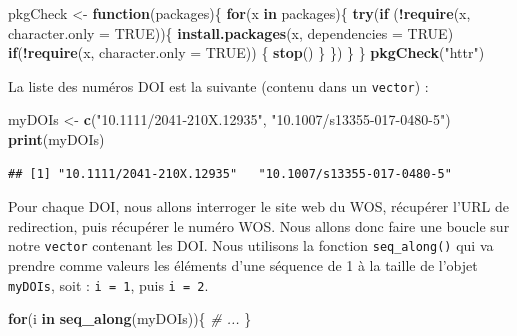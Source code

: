 \documentclass[]{book}
\newenvironment{Shaded}{\begin{snugshade}}{\end{snugshade}}
\newcommand{\CommentTok}[1]{\textcolor[rgb]{0.56,0.35,0.01}{\textit{#1}}}
\newcommand{\ControlFlowTok}[1]{\textcolor[rgb]{0.13,0.29,0.53}{\textbf{#1}}}
\newcommand{\DataTypeTok}[1]{\textcolor[rgb]{0.13,0.29,0.53}{#1}}
\newcommand{\KeywordTok}[1]{\textcolor[rgb]{0.13,0.29,0.53}{\textbf{#1}}}
\newcommand{\NormalTok}[1]{#1}
\newcommand{\OperatorTok}[1]{\textcolor[rgb]{0.81,0.36,0.00}{\textbf{#1}}}
\newcommand{\OtherTok}[1]{\textcolor[rgb]{0.56,0.35,0.01}{#1}}
\newcommand{\StringTok}[1]{\textcolor[rgb]{0.31,0.60,0.02}{#1}}
\begin{document}
\begin{Shaded}
\begin{Highlighting}[]
\NormalTok{pkgCheck <-}\StringTok{ }\ControlFlowTok{function}\NormalTok{(packages)\{}
    \ControlFlowTok{for}\NormalTok{(x }\ControlFlowTok{in}\NormalTok{ packages)\{}
        \KeywordTok{try}\NormalTok{(}\ControlFlowTok{if}\NormalTok{ (}\OperatorTok{!}\KeywordTok{require}\NormalTok{(x, }\DataTypeTok{character.only =} \OtherTok{TRUE}\NormalTok{))\{}
            \KeywordTok{install.packages}\NormalTok{(x, }\DataTypeTok{dependencies =} \OtherTok{TRUE}\NormalTok{)}
            \ControlFlowTok{if}\NormalTok{(}\OperatorTok{!}\KeywordTok{require}\NormalTok{(x, }\DataTypeTok{character.only =} \OtherTok{TRUE}\NormalTok{)) \{}
                \KeywordTok{stop}\NormalTok{()}
\NormalTok{            \}}
\NormalTok{        \})}
\NormalTok{    \}}
\NormalTok{\}}
\KeywordTok{pkgCheck}\NormalTok{(}\StringTok{"httr"}\NormalTok{)}
\end{Highlighting}
\end{Shaded}

La liste des numéros DOI est la suivante (contenu dans un \texttt{vector}) :

\begin{Shaded}
\begin{Highlighting}[]
\NormalTok{myDOIs <-}\StringTok{ }\KeywordTok{c}\NormalTok{(}\StringTok{"10.1111/2041-210X.12935"}\NormalTok{, }\StringTok{"10.1007/s13355-017-0480-5"}\NormalTok{)}
\KeywordTok{print}\NormalTok{(myDOIs)}
\end{Highlighting}
\end{Shaded}

\begin{verbatim}
## [1] "10.1111/2041-210X.12935"   "10.1007/s13355-017-0480-5"
\end{verbatim}

Pour chaque DOI, nous allons interroger le site web du WOS, récupérer l'URL de redirection, puis récupérer le numéro WOS. Nous allons donc faire une boucle sur notre \texttt{vector} contenant les DOI. Nous utilisons la fonction \texttt{seq\_along()} qui va prendre comme valeurs les éléments d'une séquence de 1 à la taille de l'objet \texttt{myDOIs}, soit : \texttt{i\ =\ 1}, puis \texttt{i\ =\ 2}.

\begin{Shaded}
\begin{Highlighting}[]
\ControlFlowTok{for}\NormalTok{(i }\ControlFlowTok{in} \KeywordTok{seq_along}\NormalTok{(myDOIs))\{}
  \CommentTok{# ...}
\NormalTok{\}}
\end{Highlighting}
\end{Shaded}
\end{document}
